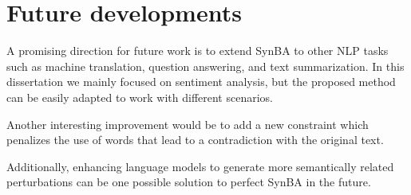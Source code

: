 \section{Future developments}\label{sec:future-developments}

A promising direction for future work is to extend SynBA to other NLP tasks such as machine translation, question answering, and text summarization.
In this dissertation we mainly focused on sentiment analysis, but the proposed method can be easily adapted to work with different scenarios. 

Another interesting improvement would be to add a new constraint which penalizes the use of words that lead to a contradiction with the original text.

Additionally, enhancing language models to generate more semantically related perturbations can be one possible solution to perfect SynBA in the future.